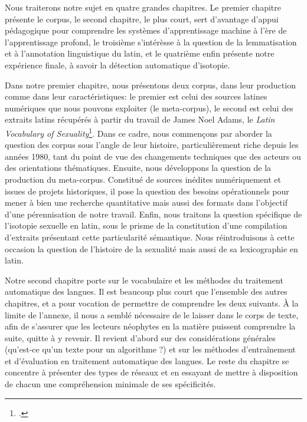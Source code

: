 Nous traiterons notre sujet en quatre grandes chapitres. Le premier chapitre présente le corpus, le second chapitre, le plus court, sert d'avantage d'appui pédagogique pour comprendre les systèmes d'apprentissage machine à l'ère de l'apprentissage profond, le troisième s'intérèsse à la question de la lemmatisation et à l'annotation linguistique du latin, et le quatrième enfin présente notre expérience finale, à savoir la détection automatique d'isotopie.

Dans notre premier chapitre, nous présentons deux corpus, dans leur production comme dans leur caractéristiques: le premier est celui des sources latines numériques que nous pouvons exploiter (le meta-corpus), le second est celui des extraits latins récupérés à partir du travail de James Noel Adams, le \textit{Latin Vocabulary of Sexuality}\footcite{adams}. Dans ce cadre, nous commençons par aborder la question des corpus sous l'angle de leur histoire, particulièrement riche depuis les années 1980, tant du point de vue des changements techniques que des acteurs ou des orientations thématiques. Ensuite, nous développons la question de la production du meta-corpus. Constitué de sources inédites numériquement et issues de projets historiques, il pose la question des besoins opérationnels pour mener à bien une recherche quantitative mais aussi des formats dans l'objectif d'une pérennisation de notre travail. Enfin, nous traitons la question spécifique de l'isotopie sexuelle en latin, sous le prisme de la constitution d'une compilation d'extraits présentant cette particularité sémantique. Nous réintroduisons à cette occasion la question de l'histoire de la sexualité mais aussi de sa lexicographie en latin.

Notre second chapitre porte sur le vocabulaire et les méthodes du traitement automatique des langues. Il est beaucoup plus court que l'ensemble des autres chapitres, et a pour vocation de permettre de comprendre les deux suivants. À la limite de l'annexe, il nous a semblé nécessaire de le laisser dans le corps de texte, afin de s'assurer que les lecteurs néophytes en la matière puissent comprendre la suite, quitte à y revenir. Il revient d'abord sur des considérations générales (qu'est-ce qu'un texte pour un algorithme ?) et sur les méthodes d'entraînement et d'évaluation en traitement automatique des langues. Le reste du chapitre se concentre à présenter des types de réseaux et en essayant de mettre à disposition de chacun une compréhension minimale de ses spécificités.

